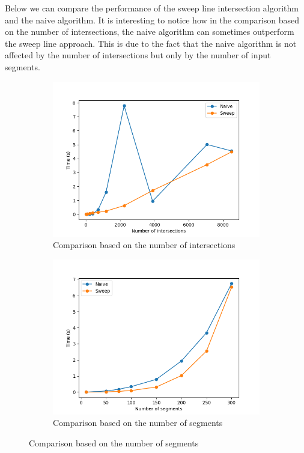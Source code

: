 Below we can compare the performance of the sweep line intersection algorithm and the naive algorithm. It is interesting to notice how in the comparison based on the number of intersections, the naive algorithm can sometimes outperform the sweep line approach. This is due to the fact that the naive algorithm is not affected by the number of intersections but only by the number of input segments.
\begin{figure}[H]
    \begin{subfigure}{0.5\textwidth}
        \centering
        \includegraphics[width=\linewidth]{images/plot_intersections.png}
        \caption{Comparison based on the number of intersections}
        \label{fig:intersections}
    \end{subfigure}
    \begin{subfigure}{0.5\textwidth}
        \centering
        \includegraphics[width=\linewidth]{images/plot_segments.png}
        \caption{Comparison based on the number of segments}
        \label{fig:segments}
    \end{subfigure}
\end{figure}


